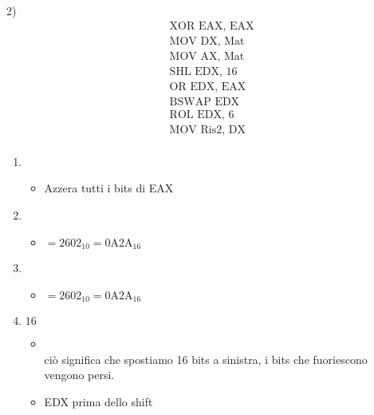 \documentclass[a4paper, 12pt]{article} %
\begin{document}

\textsf{\large{\color{red} 2) }} \\

\begin{align*}
	&\text{XOR EAX, EAX} \\
	&\text{MOV DX, Mat} \\
	&\text{MOV AX, Mat} \\
	&\text{SHL EDX, 16} \\
	&\text{OR EDX, EAX} \\
	&\text{BSWAP EDX} \\
	&\text{ROL EDX, 6} \\
	&\text{MOV Ris2, DX} \\
\end{align*}

\begin{enumerate}
	\pagebreak
	\item {} \\
	\begin{itemize}
		\item \textsf{Azzera tutti i bits di EAX}
	\end{itemize}
	\item {} \\
	\begin{itemize}
		\item {} $= 2602_{10} = 0\text{A}2\text{A}_{16}$ \\
	\end{itemize}
	\item {} \\
	\begin{itemize}
		\item {} $= 2602_{10} = 0\text{A}2\text{A}_{16}$ \\
	\end{itemize}
	\item {} $16$ \\
	\begin{itemize}
		\item {} \\
		\textsf{ciò significa che spostiamo 16 bits a sinistra, i bits che fuoriescono vengono persi.} \\
		\item  \textrm{\normalsize{\color{red} EDX \normalcolor prima dello shift}}\\

\end{itemize}
\end{enumerate}
\end{document}
